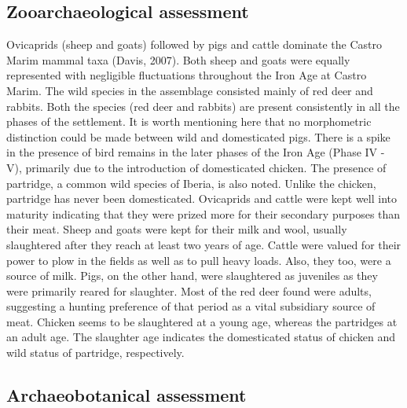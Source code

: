 \documentclass[review]{elsarticle} %
\begin{document}
\hypertarget{zooarchaeological-assessment}{%
\subsection{Zooarchaeological assessment}\label{zooarchaeological-assessment}}

Ovicaprids (sheep and goats) followed by pigs and cattle dominate the Castro Marim mammal taxa (Davis, 2007). Both sheep and goats were equally represented with negligible fluctuations throughout the Iron Age at Castro Marim. The wild species in the assemblage consisted mainly of red deer and rabbits. Both the species (red deer and rabbits) are present consistently in all the phases of the settlement. It is worth mentioning here that no morphometric distinction could be made between wild and domesticated pigs. There is a spike in the presence of bird remains in the later phases of the Iron Age (Phase IV - V), primarily due to the introduction of domesticated chicken. The presence of partridge, a common wild species of Iberia, is also noted. Unlike the chicken, partridge has never been domesticated. Ovicaprids and cattle were kept well into maturity indicating that they were prized more for their secondary purposes than their meat. Sheep and goats were kept for their milk and wool, usually slaughtered after they reach at least two years of age. Cattle were valued for their power to plow in the fields as well as to pull heavy loads. Also, they too, were a source of milk. Pigs, on the other hand, were slaughtered as juveniles as they were primarily reared for slaughter. Most of the red deer found were adults, suggesting a hunting preference of that period as a vital subsidiary source of meat. Chicken seems to be slaughtered at a young age, whereas the partridges at an adult age. The slaughter age indicates the domesticated status of chicken and wild status of partridge, respectively.

\hypertarget{archaeobotanical-assessment}{%
\subsection{Archaeobotanical assessment}\label{archaeobotanical-assessment}}
\end{document}
